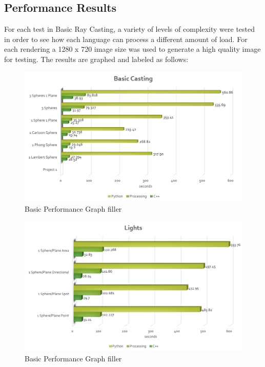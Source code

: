 \subsection{Performance Results}
For each test in Basic Ray Casting, a variety of levels of complexity were tested in order to see how each language can process a different amount of load.  For each rendering a 1280 x 720 image size was used to generate a high quality image for testing.  The results are graphed and labeled as follows:
\begin{figure}[ht]
\centering
\includegraphics[width=\textwidth]{figures/graphs/basic-graph.png}
\caption{Basic Performance Graph filler}
\label{fig:basicgraph}
\end{figure}

\begin{figure}[ht]
\centering
\includegraphics[width=\textwidth]{figures/graphs/lights-graph.png}
\caption{Basic Performance Graph filler}
\label{fig:lightsgraph}
\end{figure}

